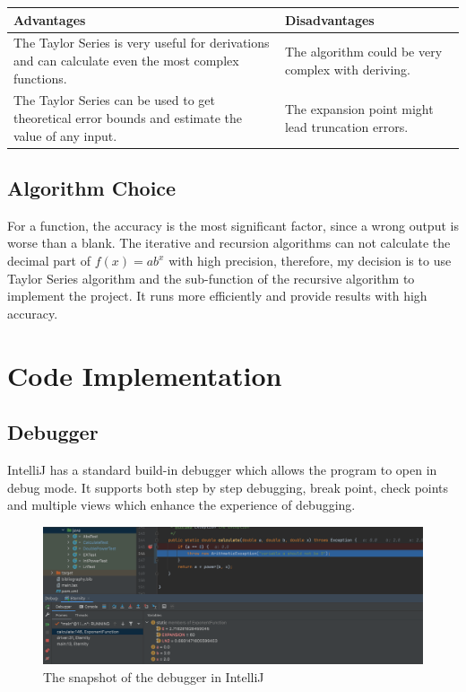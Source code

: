 \documentclass[11pt]{article}
\begin{document}
\begin{center}
    \begin{tabular}{|p{7cm}|p{7cm}|}\hline
        \textbf{Advantages} & \textbf{Disadvantages}\\\hline
        The Taylor Series is very useful for derivations and can calculate even the most complex functions. & The algorithm could be very complex with deriving.\\\hline The Taylor Series can be used to get theoretical error bounds and estimate the value of any input\cite{hariharan2010comparative}.  & The expansion point might lead truncation errors.\\\hline
    \end{tabular}
\end{center}
\subsection{Algorithm Choice}
For a function, the accuracy is the most significant factor, since a wrong output is worse than a blank. The iterative and recursion algorithms can not calculate the decimal part of $f(x) = ab^x$ with high precision, therefore, my decision is to use Taylor Series algorithm and the sub-function of the recursive algorithm to implement the project. It  runs more efficiently and provide results with high accuracy.

\section{Code Implementation}
\subsection{Debugger}
IntelliJ has a standard build-in debugger which allows the program to open in debug mode. It supports both step by step debugging, break point, check points and multiple views which enhance the experience of debugging.

\begin{figure}[h]
    \centering
    \includegraphics[width=15cm]{images/debugger.png}
    \caption{The snapshot of the debugger in IntelliJ}
    \label{fig:debugger}
\end{figure}
\end{document}
